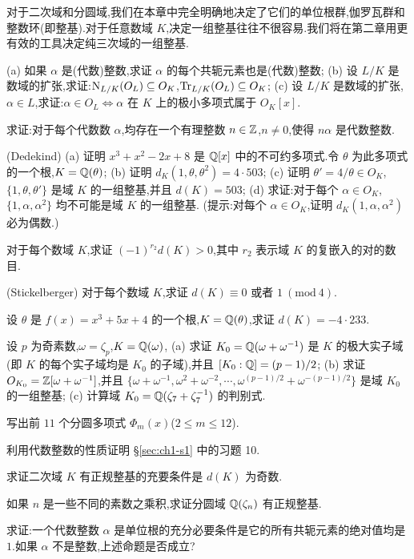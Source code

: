 对于二次域和分圆域,我们在本章中完全明确地决定了它们的单位根群,伽罗瓦群和整数环(即整基).对于任意数域 $K$,决定一组整基往往不很容易.我们将在第二章用更有效的工具决定纯三次域的一组整基.

\begin{Exercises}
  \item (a) 如果 $\alpha$ 是(代数)整数,求证 $\alpha$ 的每个共轭元素也是(代数)整数;
        (b) 设 $L/K$ 是数域的扩张,求证:$\mathrm{N}_{L/K}(O_L)\subseteq O_K$,$\mathrm{Tr}_{L/K}(O_L)\subseteq O_K$;
        (c) 设 $L/K$ 是数域的扩张,$\alpha\in L$,求证:$\alpha\in O_L\iff\alpha$ 在 $K$ 上的极小多项式属于 $O_K[x]$.
  \item 求证:对于每个代数数 $\alpha$,均存在一个有理整数 $n\in\mathbb{Z}$,$n\neq 0$,使得 $n\alpha$ 是代数整数.
  \item (Dedekind) (a) 证明 $x^3+x^2-2x+8$ 是 $\mathbb{Q}[x]$ 中的不可约多项式.令 $\theta$ 为此多项式的一个根,$K=\mathbb{Q}(\theta)$;
        (b) 证明 $d_K(1,\theta,\theta^2)=4\cdot503$;
        (c) 证明 $\theta'=4/\theta\in O_K$,$\{1,\theta,\theta'\}$ 是域 $K$ 的一组整基,并且 $d(K)=503$;
        (d) 求证:对于每个 $\alpha\in O_K$,$\{1,\alpha,\alpha^2\}$ 均不可能是域 $K$ 的一组整基.
        (提示:对每个 $\alpha\in O_K$,证明 $d_K(1,\alpha,\alpha^2)$ 必为偶数.)
  \item 对于每个数域 $K$,求证 $(-1)^{r_2}d(K)>0$,其中 $r_2$ 表示域 $K$ 的复嵌入的对的数目.
  \item (Stickelberger) 对于每个数域 $K$,求证 $d(K)\equiv 0$ 或者 $1\ (\mathrm{mod}\ 4)$.
  \item 设 $\theta$ 是 $f(x)=x^3+5x+4$ 的一个根,$K=\mathbb{Q}(\theta)$,求证 $d(K)=-4\cdot233$.
  \item 设 $p$ 为奇素数,$\omega=\zeta_p$,$K=\mathbb{Q}(\omega)$,
        (a) 求证 $K_0=\mathbb{Q}(\omega+\omega^{-1})$ 是 $K$ 的极大实子域(即 $K$ 的每个实子域均是 $K_0$ 的子域),并且 $[K_0:\mathbb{Q}]=(p-1)/2$;
        (b) 求证 $O_{K_0}=\mathbb{Z}[\omega+\omega^{-1}]$,并且 $\{\omega+\omega^{-1},\omega^2+\omega^{-2},\cdots,\omega^{(p-1)/2}+\omega^{-(p-1)/2}\}$ 是域 $K_0$ 的一组整基;
        (c) 计算域 $K_0=\mathbb{Q}(\zeta_7+\zeta_7^{-1})$ 的判别式.
  \item 写出前 $11$ 个分圆多项式 $\Phi_m(x)$($2\leqslant m\leqslant 12$).
  \item 利用代数整数的性质证明 \S\ref{sec:ch1-s1} 中的习题 10.
  \item 求证二次域 $K$ 有正规整基的充要条件是 $d(K)$ 为奇数.
  \item 如果 $n$ 是一些不同的素数之乘积,求证分圆域 $\mathbb{Q}(\zeta_n)$ 有正规整基.
  \item 求证:一个代数整数 $\alpha$ 是单位根的充分必要条件是它的所有共轭元素的绝对值均是 $1$.如果 $\alpha$ 不是整数,上述命题是否成立?

\end{Exercises}
